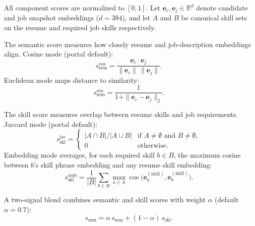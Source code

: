 All component scores are normalized to $[0,1]$.
Let $\mathbf{e}_c, \mathbf{e}_j \in \mathbb{R}^{d}$ denote candidate and job snapshot embeddings ($d{=}384$), and let $A$ and $B$ be canonical skill sets on the resume and required job skills respectively.

The semantic score measures how closely resume and job-description embeddings align.
Cosine mode (portal default):
\begin{equation}
  s_{\mathrm{sem}}^{\mathrm{cos}} =
    \frac{\mathbf{e}_c \cdot \mathbf{e}_j}{\|\mathbf{e}_c\|\,\|\mathbf{e}_j\|}.
  \label{eq:semantic-cosine}
\end{equation}
Euclidean mode maps distance to similarity:
\begin{equation}
  s_{\mathrm{sem}}^{\mathrm{euc}} = \frac{1}{1 + \|\mathbf{e}_c - \mathbf{e}_j\|_2}.
  \label{eq:semantic-euclidean}
\end{equation}

The skill score measures overlap between resume skills and job requirements.
Jaccard mode (portal default):
\begin{equation}
  s_{\mathrm{skl}}^{\mathrm{jac}} =
    \begin{cases}
      |A \cap B| / |A \cup B| & \text{if } A \neq \emptyset \text{ and } B \neq \emptyset,\\
      0 & \text{otherwise}.
    \end{cases}
  \label{eq:jaccard}
\end{equation}
Embedding mode averages, for each required skill $b \in B$, the maximum cosine between $b$'s skill phrase embedding and any resume skill embedding:
\begin{equation}
  s_{\mathrm{skl}}^{\mathrm{emb}} =
    \frac{1}{|B|} \sum_{b \in B}
    \max_{a \in A} \cos\!\bigl(\mathbf{e}_a^{(\mathrm{skill})}, \mathbf{e}_b^{(\mathrm{skill})}\bigr).
  \label{eq:skill-embed}
\end{equation}

A two-signal blend combines semantic and skill scores with weight $\alpha$ (default $\alpha{=}0.7$):
\begin{equation}
  s_{\mathrm{mm}} = \alpha\, s_{\mathrm{sem}} + (1-\alpha)\, s_{\mathrm{skl}}.
  \label{eq:multimodal}
\end{equation}

